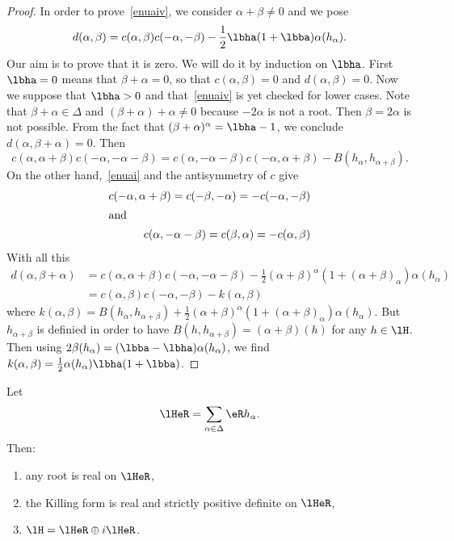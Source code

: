 \begin{proof}
In order to prove~\ref{enuaiv}, we consider $\alpha+\beta\neq0$ and we pose
\[
d(\alpha,\beta)=c(\alpha,\beta)c(-\alpha,-\beta)-\frac{1}{2}\lbha(1+\lbba)\alpha(h_{\alpha}).
\]
Our aim is to prove that it is zero. We will do it by induction on $\lbha$. First $\lbha=0$ means that $\beta+\alpha=0$, so that $c(\alpha,\beta)=0$ and $d(\alpha,\beta)=0$. Now we suppose that $\lbha>0$ and that~\ref{enuaiv} is yet checked for lower cases. Note that $\beta+\alpha\in \Delta$ and $(\beta+\alpha)+\alpha\neq 0$ because $-2\alpha$ is not a root. Then $\beta=2\alpha$ is not possible. From the fact that $(\beta+\alpha)^{\alpha}=\lbha-1$, we conclude $d(\alpha,\beta+\alpha)=0$. Then
\[
c(\alpha,\alpha+\beta)c(-\alpha,-\alpha-\beta)=c(\alpha,-\alpha-\beta)c(-\alpha,\alpha+\beta)-B(h_{\alpha},h_{\alpha+\beta}).
\]
On the other hand,~\ref{enuai} and the antisymmetry of $c$ give
\begin{subequations}
\begin{align}
c(-\alpha,\alpha+\beta)=c(-\beta,-\alpha)=-c(-\alpha,-\beta)\\
\intertext{and}
c(\alpha,-\alpha-\beta)=c(\beta,\alpha)=-c(\alpha,\beta)
\end{align}
\end{subequations}
With all this
\begin{equation}
\begin{split}
d(\alpha,\beta+\alpha)&=c(\alpha,\alpha+\beta)c(-\alpha,-\alpha-\beta)-\frac{1}{2}(\alpha+\beta)^{\alpha}(1+(\alpha+\beta)_{\alpha})\alpha(h_{\alpha})\\
&=c(\alpha,\beta)c(-\alpha,-\beta)-k(\alpha,\beta)
\end{split}
\end{equation}
where $k(\alpha,\beta)=B(h_{\alpha},h_{\alpha+\beta})+\frac{1}{2}(\alpha+\beta)^{\alpha}(1+(\alpha+\beta)_{\alpha})\alpha(h_{\alpha})$. But $h_{\alpha+\beta}$ is definied in order to have $B(h,h_{\alpha+\beta})=(\alpha+\beta)(h)$ for any $h\in\lH$. Then using $2\beta(h_{\alpha})=(\lbba-\lbha)\alpha(h_{\alpha})$, we find $k(\alpha,\beta)=\frac{1}{2}\alpha(h_{\alpha})\lbha(1+\lbba)$.
\end{proof}

\begin{proposition}\label{prop:lHeR}
Let
\begin{equation}
\lHeR=\sum_{\alpha\in\Delta}\eR h_{\alpha}.
\end{equation}
Then:
\begin{enumerate}
    \item any root is real on $\lHeR$,
    \item the Killing form is real and strictly positive definite on $\lHeR$,
    \item $\lH=\lHeR\oplus i\lHeR$.
\end{enumerate}
\end{proposition}

